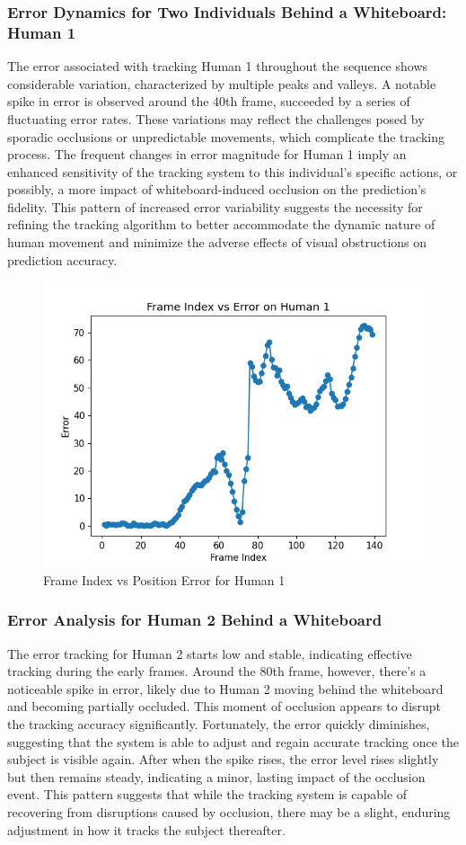 \documentclass{article}
\begin{document}
\subsubsection{Error Dynamics for Two Individuals Behind a Whiteboard: Human 1}

The error associated with tracking Human 1 throughout the sequence shows considerable variation, characterized by multiple peaks and valleys. A notable spike in error is observed around the 40th frame, succeeded by a series of fluctuating error rates. These variations may reflect the challenges posed by sporadic occlusions or unpredictable movements, which complicate the tracking process. The frequent changes in error magnitude for Human 1 imply an enhanced sensitivity of the tracking system to this individual’s specific actions, or possibly, a more impact of whiteboard-induced occlusion on the prediction's fidelity. This pattern of increased error variability suggests the necessity for refining the tracking algorithm to better accommodate the dynamic nature of human movement and minimize the adverse effects of visual obstructions on prediction accuracy.

\begin{figure}[H]
\centering
\includegraphics[width=0.5\linewidth]{plot_1.png}
\caption{Frame Index vs Position Error for Human 1}
\label{fig:two human behind board}
\end{figure}

\subsubsection{Error Analysis for Human 2 Behind a Whiteboard}

The error tracking for Human 2 starts low and stable, indicating effective tracking during the early frames. Around the 80th frame, however, there's a noticeable spike in error, likely due to Human 2 moving behind the whiteboard and becoming partially occluded. This moment of occlusion appears to disrupt the tracking accuracy significantly. Fortunately, the error quickly diminishes, suggesting that the system is able to adjust and regain accurate tracking once the subject is visible again. After when the spike rises, the error level rises slightly but then remains steady, indicating a minor, lasting impact of the occlusion event. This pattern suggests that while the tracking system is capable of recovering from disruptions caused by occlusion, there may be a slight, enduring adjustment in how it tracks the subject thereafter.
\end{document}
